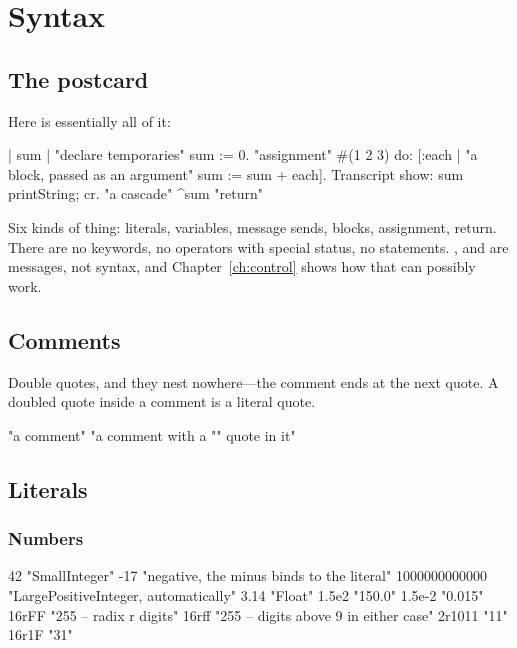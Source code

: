 \chapter{Syntax}
\label{ch:syntax}


\section{The postcard}

Here is essentially all of it:

\begin{st}
| sum |                          "declare temporaries"
sum := 0.                        "assignment"
#(1 2 3) do: [:each |            "a block, passed as an argument"
    sum := sum + each].
Transcript show: sum printString; cr.   "a cascade"
^sum                             "return"
\end{st}

Six kinds of thing: literals, variables, message sends, blocks, assignment,
return. There are no keywords, no operators with special status, no
statements. ,  and  are messages, not
syntax, and Chapter~\ref{ch:control} shows how that can possibly work.

\section{Comments}

Double quotes, and they nest nowhere---the comment ends at the next quote. A
doubled quote inside a comment is a literal quote.

\begin{st}
"a comment"
"a comment with a "" quote in it"
\end{st}

\section{Literals}

\subsection{Numbers}

\begin{st}
42                  "SmallInteger"
-17                 "negative, the minus binds to the literal"
1000000000000       "LargePositiveInteger, automatically"
3.14                "Float"
1.5e2               "150.0"
1.5e-2              "0.015"
16rFF               "255 -- radix r digits"
16rff               "255 -- digits above 9 in either case"
2r1011              "11"
16r1F               "31"
\end{st}

